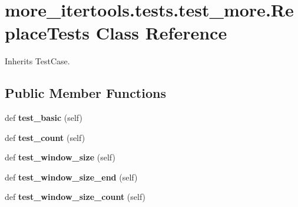 \hypertarget{classmore__itertools_1_1tests_1_1test__more_1_1_replace_tests}{}\section{more\+\_\+itertools.\+tests.\+test\+\_\+more.\+Replace\+Tests Class Reference}
\label{classmore__itertools_1_1tests_1_1test__more_1_1_replace_tests}


Inherits Test\+Case.

\subsection*{Public Member Functions}
\begin{DoxyCompactItemize}
\item 
\mbox{\label{classmore__itertools_1_1tests_1_1test__more_1_1_replace_tests_a104bb1fb2ed81339287168f25ea29dfd}} 
def {\bfseries test\+\_\+basic} (self)
\item 
\mbox{\label{classmore__itertools_1_1tests_1_1test__more_1_1_replace_tests_a915946e323cb258bd7a4bf1b46cc9537}} 
def {\bfseries test\+\_\+count} (self)
\item 
\mbox{\label{classmore__itertools_1_1tests_1_1test__more_1_1_replace_tests_ae3c3a1556be233f96ab3586533ccb4a8}} 
def {\bfseries test\+\_\+window\+\_\+size} (self)
\item 
\mbox{\label{classmore__itertools_1_1tests_1_1test__more_1_1_replace_tests_ab897929201dbda2a2ce881fc6b8dd98c}} 
def {\bfseries test\+\_\+window\+\_\+size\+\_\+end} (self)
\item 
\mbox{\label{classmore__itertools_1_1tests_1_1test__more_1_1_replace_tests_aa665833d161e5bfdc444e29de1c7f118}} 
def {\bfseries test\+\_\+window\+\_\+size\+\_\+count} (self)
\item 
\mbox{\label{classmore__itertools_1_1tests_1_1test__more_1_1_replace_tests_a902986935cabfff6baa229a8a571cc23}} 

\end{DoxyCompactItemize}
